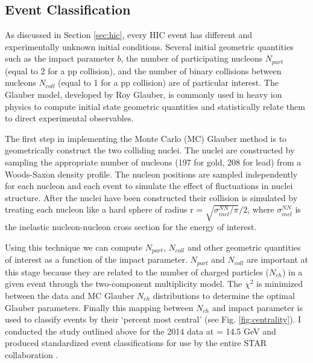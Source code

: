	\subsection{Event Classification}
	\label{sec:mc_glauber}

	As discussed in Section \ref{sec:hic}, every HIC event has different and experimentally unknown initial conditions. Several initial geometric quantities such as the impact parameter $b$, the number of participating nucleons $N_{part}$ (equal to 2 for a pp collision), and the number of binary collisions between nucleons $N_{coll}$ (equal to 1 for a pp collision) are of particular interest. The Glauber model, developed by Roy Glauber, is commonly used in heavy ion physics to compute initial state geometric quantities and statistically relate them to direct experimental observables\cite{miller_glauber_2007}. 

	The first step in implementing the Monte Carlo (MC) Glauber method is to geometrically construct the two colliding nuclei. The nuclei are constructed by sampling the appropriate number of nucleons (197 for gold, 208 for lead) from a Woods-Saxon density profile. The nucleon positions are sampled independently for each nucleon and each event to simulate the effect of fluctuations in nuclei structure. After the nuclei have been constructed their collision is simulated by treating each nucleon like a hard sphere of radius r = $\sqrt{\sigma^{NN}_{inel}/\pi}/2$, where $\sigma^{NN}_{inel}$ is the inelastic nucleon-nucleon cross section for the \snn energy of interest\cite{j.bystricky_energy_1987}. 

	Using this technique we can compute $N_{part}$, $N_{coll}$ and other geometric quantities of interest as a function of the impact parameter. $N_{part}$ and $N_{coll}$ are important at this stage because they are related to the number of charged particles ($N_{ch}$) in a given event through the two-component multiplicity model\cite{fialkowski_high_1973}. The $\chi^2$ is minimized between the data and MC Glauber $N_{ch}$ distributions to determine the optimal Glauber parameters. Finally this mapping between $N_{ch}$ and impact parameter is used to classify events by their `percent most central' (see Fig. \ref{fig:centrality}). I conducted the study outlined above for the 2014 \auau data at \snn = 14.5 GeV and produced standardized event classifications for use by the entire STAR collaboration \cite{brandenburg_auau}.

